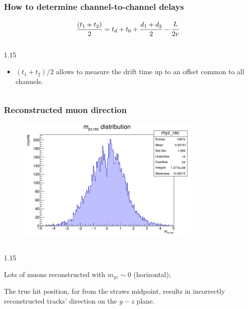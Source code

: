 \documentclass{beamer}
\begin{document}
\begin{frame}
    \frametitle{How to determine channel-to-channel delays}
$$
            \frac{(t_1 + t_2)}{2} = t_d+t_0+\frac{d_1+d_2}{2}-\cfrac{L}{2v} 
 $$
 \begin{columns}
    \begin{column}{1.15\framewidth}
 \begin{itemize}
    \item $(t_1 + t_2) / 2$ allows to measure the drift time  
    up to an offset common to all channels.

 \end{itemize}

\end{column}
    \end{columns}
\end{frame}
\begin{frame}
    \frametitle{Reconstructed muon direction}
    \begin{figure}[!h]
        \centering
        \includegraphics[width =0.8\textwidth]{figures/png/myz_rec.png}
       \end{figure}
       \begin{columns}
        \begin{column}{1.15\framewidth}
            \begin{itemize}
               {\small \item Lots of muons reconstructed with $m_{yz}\sim 0$ (horizontal);
               \item The true hit position, far from the straws midpoint, 
               results in incorrectly reconstructed tracks' direction on the $y-z$ plane.
                }
            \end{itemize}
        \end{column}
        \end{columns}
\end{frame}
\end{document}
